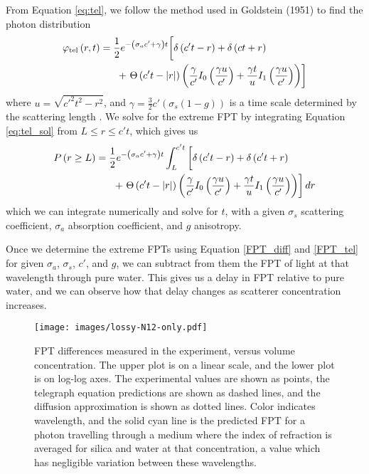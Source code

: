 \documentclass[floatfix,aps,prl,reprint,groupedaddress]{revtex4-2}
\begin{document}
From Equation \ref{eq:tel}, we follow the method used in Goldstein (1951) to find the photon distribution
\begin{align}
    \varphi_{\textrm{tel}} \left(r,t\right) &= \frac{1}{2} e^{-\left(\sigma_{a}c' + \gamma \right)t} \bigg[\delta \left(c't - r\right) + \delta\left(ct + r\right) \notag\\
    &\ \ \ \ \ +\left. \Theta\left(c't - |r|\right) \left(\frac{\gamma}{c'}I_{0}\left(\frac{\gamma u}{c'}\right) + \frac{\gamma t}{u}I_{1}\left(\frac{\gamma u}{c'}\right)\right)\right] \label{eq:tel_sol}
\end{align}
where $u=\sqrt{c'^{2}t^{2}-r^{2}}$, and $\gamma = \frac{3}{2} c'\left(\sigma_{s}\left(1-g\right)\right)$ is a time scale determined by the scattering length \cite{goldstein_diffusion_1951,masoliver_solution_1993,masoliver_telegraphers_1994,masoliver_finite-velocity_1996}. We solve for the extreme FPT by integrating Equation \ref{eq:tel_sol} from $L \leq r \leq c' t$, which gives us
\begin{align}
    P\left(r\geq L\right) &=  \frac{1}{2}e^{-\left(\sigma_{a}c' + \gamma \right)t} \int^{c' t}_{L}\bigg[ \delta \left(c't - r\right)  + \delta\left(c't + r\right) \notag\\
    &\left.\ \ \ \ \ + \  \Theta\left(c't - |r|\right) \left(\frac{\gamma}{c'}I_{0}\left(\frac{\gamma u}{c'}\right) + \frac{\gamma t}{u}I_{1}\left(\frac{\gamma u}{c'}\right)\right)\right]  dr \label{FPT_tel}
\end{align}
which we can integrate numerically and solve for $t$, with a given $\sigma_{s}$ scattering coefficient, $\sigma_{a}$ absorption coefficient, and $g$ anisotropy. 

Once we determine the extreme FPTs using Equation \ref{FPT_diff} and \ref{FPT_tel} for given $\sigma_{a}$, $\sigma_{s}$, $c'$, and $g$, we can subtract from them the FPT of light at that wavelength through pure water. This gives us a delay in FPT relative to pure water, and we can observe how that delay changes as scatterer concentration increases.


\begin{figure}[!h]
\texttt{[image: images/lossy-N12-only.pdf]}
\caption{\label{fig:alldata} FPT differences measured in the experiment, versus volume concentration. The upper plot is on a linear scale, and the lower plot is on log-log axes. The experimental values are shown as points, the telegraph equation predictions are shown as dashed lines, and the diffusion approximation is shown as dotted lines. Color indicates wavelength, and the solid cyan line is the predicted FPT for a photon travelling through a medium where the index of refraction is averaged for silica and water at that concentration, a value which has negligible variation between these wavelengths.}
\end{figure}
\end{document}
